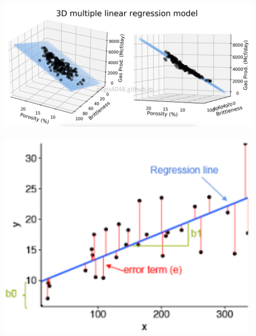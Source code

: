 \documentclass[t, 11pt]{beamer}
\begin{document}
\begin{frame} 
	\frametitle{\insertsection} 
	\begin{center}
		\includegraphics[scale=0.2]{reg_line_3d}
	\end{center}
\end{frame}	

\begin{frame} 
	\frametitle{\insertsection} 
	\begin{center}
		\includegraphics[scale=0.7]{reg_res_2d}
	\end{center}
\end{frame}	
\end{document}
